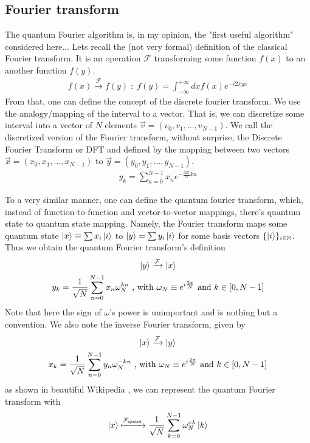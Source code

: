 \subsection*{Fourier transform}
The quantum Fourier algorithm is, in my opinion, the "first useful algorithm" considered here...
Lets recall the (not very formal) definition of the classical Fourier transform. It is an operation $\mathcal{F}$ 
transforming some function $f(x)$ to an another function $f(y)$.
\begin{gather}
  f(x) \xrightarrow{\mathcal{F}} f(y) \; : \; f(y) = \int^{+\infty}_{-\infty}dx f(x) e^{-i2\pi y x}
\end{gather}
From that, one can define the concept of the discrete fourier transform. We use the analogy/mapping of the 
interval to a vector. That is, we can discretize some interval into a vector of $N$ elements $\vec{v}=(v_0, v_1, ..., v_{N-1})$.
We call the discretized version of the Fourier transform, without surprise, the Discrete Fourier Transform or DFT and defined by the mapping 
between two vectors $\vec{x}=(x_0, x_1,..., x_{N-1})$ to $\vec{y}=(y_0, y_1,...,y_{N-1})$.
\begin{gather}
  y_k = \sum_{n=0}^{N-1} x_n e^{-\frac{i2\pi}{N}kn}
\end{gather}

To a very similar manner, one can define the quantum fourier transform, which, instead of function-to-function and vector-to-vector mappings, 
there's quantum state to quantum state mapping. Namely, the Fourier transform maps some quantum state $\ket{x}\equiv \sum x_i \ket{i}$ to 
$\ket{y}=\sum y_i\ket{i}$ for some basis vectors $\{\ket{i}\}_{i\in \mathbb{N}}$. Thus we obtain the quantum Fourier transform's definition 
\begin{gather}
  \ket{y}\xrightarrow{\mathcal{F}} \ket{x}\\
  y_k=\frac{1}{\sqrt{N}} \sum_{n=0}^{N-1} x_n \omega_N^{kn} \text{ , with } \omega_N \equiv e^{i\frac{2\pi}{N}} \text{ and } k\in [0, N-1]
  \label{eq:qft_definition_components}
\end{gather}
Note that here the sign of $\omega$'s power is unimportant and is nothing but a convention. We also note the inverse Fourier transform, given by 
\begin{gather}
  \ket{x}\xrightarrow{\mathcal{F}} \ket{y}\\
  x_k=\frac{1}{\sqrt{N}} \sum_{n=0}^{N-1} y_n \omega_N^{-kn} \text{ , with } \omega_N \equiv e^{i\frac{2\pi}{N}} \text{ and } k\in [0, N-1]
\end{gather}
as shown in beautiful Wikipedia \cite{noauthor_quantum_2022}, we can represent the quantum Fourier transform with 
\begin{gather}
  \ket{x} \xmapsto{\mathcal{F}_{\text{quant}}} \frac{1}{\sqrt{N}} \sum_{k=0}^{N-1}\omega_N^{xk}\ket{k}
  \label{eq:qft_mapsto}
\end{gather}

